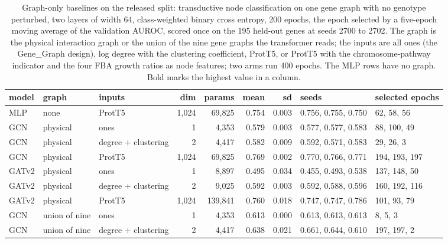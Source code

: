 \begin{table}[H]
  \centering
  \scriptsize
  \setlength{\tabcolsep}{3pt}
  \caption[Graph-only baselines]{Graph-only baselines on the released split: transductive node classification on one gene graph with no genotype perturbed, two layers of width 64, class-weighted binary cross entropy, 200 epochs, the epoch selected by a five-epoch moving average of the validation AUROC, scored once on the 195 held-out genes at seeds 2700 to 2702. The graph is the physical interaction graph or the union of the nine gene graphs the transformer reads; the inputs are all ones (the Gene\_Graph design), log degree with the clustering coefficient, ProtT5, or ProtT5 with the chromosome-pathway indicator and the four FBA growth ratios as node features; two arms run 400 epochs. The MLP rows have no graph. Bold marks the highest value in a column.}
  \label{tab:graph-baselines}
  \begin{tabular}{@{}lllrrrrll@{}}
    \hline
    model & graph & inputs & dim & params & mean & sd & seeds & selected epochs \\
    \hline
    MLP & none & ProtT5 & 1,024 & 69,825 & 0.754 & 0.003 & 0.756, 0.755, 0.750 & 62, 58, 56 \\
    GCN & physical & ones & 1 & 4,353 & 0.579 & 0.003 & 0.577, 0.577, 0.583 & 88, 100, 49 \\
    GCN & physical & degree $+$ clustering & 2 & 4,417 & 0.582 & 0.009 & 0.592, 0.571, 0.583 & 29, 26, 3 \\
    GCN & physical & ProtT5 & 1,024 & 69,825 & 0.769 & 0.002 & 0.770, 0.766, 0.771 & 194, 193, 197 \\
    GATv2 & physical & ones & 1 & 8,897 & 0.495 & 0.034 & 0.455, 0.493, 0.538 & 137, 148, 50 \\
    GATv2 & physical & degree $+$ clustering & 2 & 9,025 & 0.592 & 0.003 & 0.592, 0.588, 0.596 & 160, 192, 116 \\
    GATv2 & physical & ProtT5 & 1,024 & 139,841 & 0.760 & 0.018 & 0.747, 0.747, 0.786 & 101, 93, 79 \\
    GCN & union of nine & ones & 1 & 4,353 & 0.613 & 0.000 & 0.613, 0.613, 0.613 & 8, 5, 3 \\
    GCN & union of nine & degree $+$ clustering & 2 & 4,417 & 0.638 & 0.021 & 0.661, 0.644, 0.610 & 197, 197, 2 \\

\end{tabular}
\end{table}
